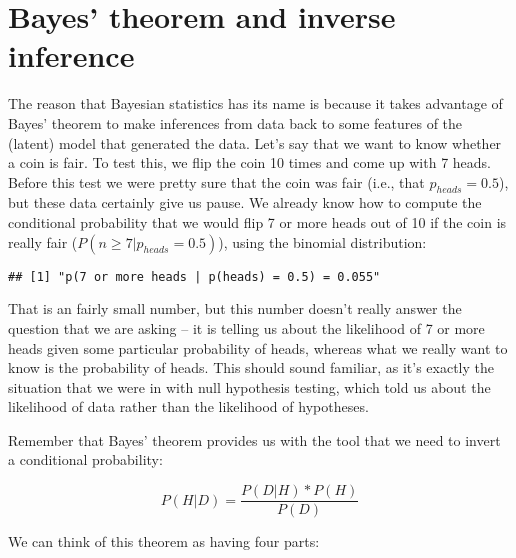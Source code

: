\documentclass[]{book}
\newenvironment{Shaded}{\begin{snugshade}}{\end{snugshade}}
\newcommand{\KeywordTok}[1]{\textcolor[rgb]{0.13,0.29,0.53}{\textbf{#1}}}
\newcommand{\DataTypeTok}[1]{\textcolor[rgb]{0.13,0.29,0.53}{#1}}
\newcommand{\DecValTok}[1]{\textcolor[rgb]{0.00,0.00,0.81}{#1}}
\newcommand{\StringTok}[1]{\textcolor[rgb]{0.31,0.60,0.02}{#1}}
\newcommand{\CommentTok}[1]{\textcolor[rgb]{0.56,0.35,0.01}{\textit{#1}}}
\newcommand{\OtherTok}[1]{\textcolor[rgb]{0.56,0.35,0.01}{#1}}
\newcommand{\NormalTok}[1]{#1}
\theoremstyle{definition}
\theoremstyle{definition}
\theoremstyle{definition}
\theoremstyle{remark}
\begin{document}
\section{Bayes' theorem and inverse
inference}\label{bayes-theorem-and-inverse-inference}

The reason that Bayesian statistics has its name is because it takes
advantage of Bayes' theorem to make inferences from data back to some
features of the (latent) model that generated the data. Let's say that
we want to know whether a coin is fair. To test this, we flip the coin
10 times and come up with 7 heads. Before this test we were pretty sure
that the coin was fair (i.e., that \(p_{heads}=0.5\)), but these data
certainly give us pause. We already know how to compute the conditional
probability that we would flip 7 or more heads out of 10 if the coin is
really fair (\(P(n\ge7|p_{heads}=0.5)\)), using the binomial
distribution:

\begin{Shaded}
\end{Shaded}

\begin{verbatim}
## [1] "p(7 or more heads | p(heads) = 0.5) = 0.055"
\end{verbatim}

That is an fairly small number, but this number doesn't really answer
the question that we are asking -- it is telling us about the likelihood
of 7 or more heads given some particular probability of heads, whereas
what we really want to know is the probability of heads. This should
sound familiar, as it's exactly the situation that we were in with null
hypothesis testing, which told us about the likelihood of data rather
than the likelihood of hypotheses.

Remember that Bayes' theorem provides us with the tool that we need to
invert a conditional probability:

\[
P(H|D) = \frac{P(D|H)*P(H)}{P(D)}
\]

We can think of this theorem as having four parts:
\end{document}
